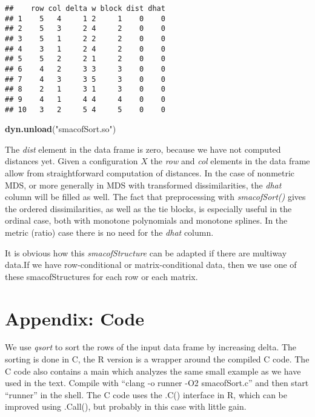 \documentclass[
  12pt,
]{article}
\newenvironment{Shaded}{\begin{snugshade}}{\end{snugshade}}
\newcommand{\FunctionTok}[1]{\textcolor[rgb]{0.13,0.29,0.53}{\textbf{#1}}}
\newcommand{\NormalTok}[1]{#1}
\newcommand{\StringTok}[1]{\textcolor[rgb]{0.31,0.60,0.02}{#1}}
\begin{document}
\begin{verbatim}
##    row col delta w block dist dhat
## 1    5   4     1 2     1    0    0
## 2    5   3     2 4     2    0    0
## 3    5   1     2 2     2    0    0
## 4    3   1     2 4     2    0    0
## 5    5   2     2 1     2    0    0
## 6    4   2     3 3     3    0    0
## 7    4   3     3 5     3    0    0
## 8    2   1     3 1     3    0    0
## 9    4   1     4 4     4    0    0
## 10   3   2     5 4     5    0    0
\end{verbatim}

\begin{Shaded}
\begin{Highlighting}[]
\FunctionTok{dyn.unload}\NormalTok{(}\StringTok{"smacofSort.so"}\NormalTok{)}
\end{Highlighting}
\end{Shaded}

The \emph{dist} element in the data frame is zero, because we have not computed distances yet.
Given a configuration \(X\) the \emph{row} and \emph{col} elements in the data frame allow from
straightforward computation of distances. In the case of nonmetric MDS, or more generally
in MDS with transformed dissimilarities, the \emph{dhat} column will be filled as well.
The fact that preprocessing with \emph{smacofSort()} gives the ordered dissimilarities, as
well as the tie blocks, is especially useful in the ordinal case, both with monotone
polynomials and monotone splines. In the metric (ratio) case there is no need for the
\emph{dhat} column.

It is obvious how this \emph{smacofStructure} can be adapted if there are multiway data.If we have row-conditional or matrix-conditional data, then we use one of these smacofStructures for each
row or each matrix.

\section{Appendix: Code}\label{appendix-code}

We use \emph{qsort} to sort the rows of the input data frame by increasing delta. The sorting
is done in C, the R version is a wrapper around the compiled C code. The C code also
contains a main which analyzes the same small example as we have used in the text.
Compile with ``clang -o runner -O2 smacofSort.c'' and then start ``runner'' in the shell.
The C code uses the .C() interface in R, which can be improved using .Call(),
but probably in this case with little gain.
\end{document}
